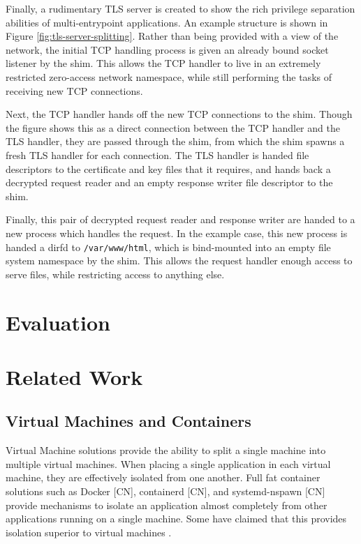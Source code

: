 \documentclass[sigplan]{acmart}
\begin{document}
Finally, a rudimentary TLS server is created to show the rich privilege separation abilities of multi-entrypoint applications. An example structure is shown in Figure \ref{fig:tls-server-splitting}. Rather than being provided with a view of the network, the initial TCP handling process is given an already bound socket listener by the shim. This allows the TCP handler to live in an extremely restricted zero-access network namespace, while still performing the tasks of receiving new TCP connections.

Next, the TCP handler hands off the new TCP connections to the shim. Though the figure shows this as a direct connection between the TCP handler and the TLS handler, they are passed through the shim, from which the shim spawns a fresh TLS handler for each connection. The TLS handler is handed file descriptors to the certificate and key files that it requires, and hands back a decrypted request reader and an empty response writer file descriptor to the shim.

Finally, this pair of decrypted request reader and response writer are handed to a new process which handles the request. In the example case, this new process is handed a dirfd to \texttt{/var/www/html}, which is bind-mounted into an empty file system namespace by the shim. This allows the request handler enough access to serve files, while restricting access to anything else.

\section{Evaluation}


\section{Related Work}

\subsection{Virtual Machines and Containers}

Virtual Machine solutions \citep{barham_xen_2003,vmware_inc_understanding_2008} provide the ability to split a single machine into multiple virtual machines. When placing a single application in each virtual machine, they are effectively isolated from one another. Full fat container solutions such as Docker [CN], containerd [CN], and systemd-nspawn [CN] provide mechanisms to isolate an application almost completely from other applications running on a single machine. Some have claimed that this provides isolation superior to virtual machines \citep{soltesz_container-based_2007}.
\end{document}
